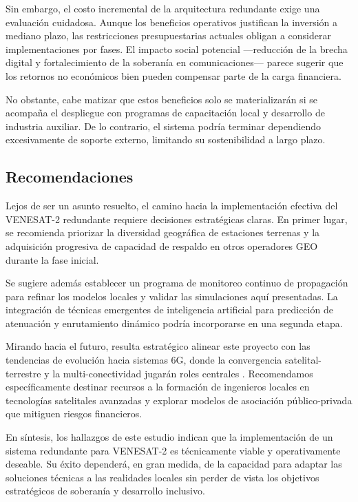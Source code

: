 Sin embargo, el costo incremental de la arquitectura redundante exige una evaluación cuidadosa. Aunque los beneficios operativos justifican la inversión a mediano plazo, las restricciones presupuestarias actuales obligan a considerar implementaciones por fases. El impacto social potencial —reducción de la brecha digital y fortalecimiento de la soberanía en comunicaciones— parece sugerir que los retornos no económicos bien pueden compensar parte de la carga financiera.

No obstante, cabe matizar que estos beneficios solo se materializarán si se acompaña el despliegue con programas de capacitación local y desarrollo de industria auxiliar. De lo contrario, el sistema podría terminar dependiendo excesivamente de soporte externo, limitando su sostenibilidad a largo plazo.

\subsection{Recomendaciones}

Lejos de ser un asunto resuelto, el camino hacia la implementación efectiva del VENESAT-2 redundante requiere decisiones estratégicas claras. En primer lugar, se recomienda priorizar la diversidad geográfica de estaciones terrenas y la adquisición progresiva de capacidad de respaldo en otros operadores GEO durante la fase inicial.

Se sugiere además establecer un programa de monitoreo continuo de propagación para refinar los modelos locales y validar las simulaciones aquí presentadas. La integración de técnicas emergentes de inteligencia artificial para predicción de atenuación y enrutamiento dinámico podría incorporarse en una segunda etapa.

Mirando hacia el futuro, resulta estratégico alinear este proyecto con las tendencias de evolución hacia sistemas 6G, donde la convergencia satelital-terrestre y la multi-conectividad jugarán roles centrales \cite{SatComm6G2025}. Recomendamos específicamente destinar recursos a la formación de ingenieros locales en tecnologías satelitales avanzadas y explorar modelos de asociación público-privada que mitiguen riesgos financieros.

En síntesis, los hallazgos de este estudio indican que la implementación de un sistema redundante para VENESAT-2 es técnicamente viable y operativamente deseable. Su éxito dependerá, en gran medida, de la capacidad para adaptar las soluciones técnicas a las realidades locales sin perder de vista los objetivos estratégicos de soberanía y desarrollo inclusivo.